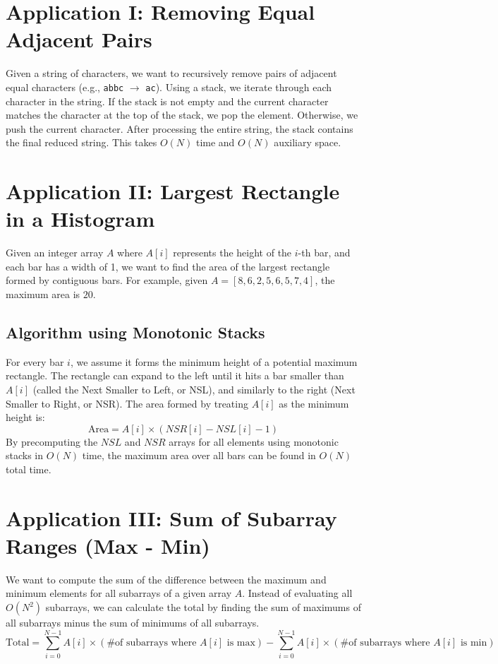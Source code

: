 \documentclass[10pt,journal,compsoc,onecolumn]{IEEEtran}
\begin{document}
\section{Application I: Removing Equal Adjacent Pairs}
Given a string of characters, we want to recursively remove pairs of adjacent equal characters (e.g., \texttt{abbc} $\to$ \texttt{ac}). Using a stack, we iterate through each character in the string. If the stack is not empty and the current character matches the character at the top of the stack, we pop the element. Otherwise, we push the current character. After processing the entire string, the stack contains the final reduced string. This takes $O(N)$ time and $O(N)$ auxiliary space.

\section{Application II: Largest Rectangle in a Histogram}
Given an integer array $A$ where $A[i]$ represents the height of the $i$-th bar, and each bar has a width of 1, we want to find the area of the largest rectangle formed by contiguous bars.
For example, given $A = [8, 6, 2, 5, 6, 5, 7, 4]$, the maximum area is $20$.

\subsection{Algorithm using Monotonic Stacks}
For every bar $i$, we assume it forms the minimum height of a potential maximum rectangle. The rectangle can expand to the left until it hits a bar smaller than $A[i]$ (called the Next Smaller to Left, or NSL), and similarly to the right (Next Smaller to Right, or NSR).
The area formed by treating $A[i]$ as the minimum height is:
\begin{equation}
\text{Area} = A[i] \times (NSR[i] - NSL[i] - 1)
\end{equation}
By precomputing the $NSL$ and $NSR$ arrays for all elements using monotonic stacks in $O(N)$ time, the maximum area over all bars can be found in $O(N)$ total time.

\section{Application III: Sum of Subarray Ranges (Max - Min)}
We want to compute the sum of the difference between the maximum and minimum elements for all subarrays of a given array $A$.
Instead of evaluating all $O(N^2)$ subarrays, we can calculate the total by finding the sum of maximums of all subarrays minus the sum of minimums of all subarrays.
\begin{equation}
\text{Total} = \sum_{i=0}^{N-1} A[i] \times (\text{\# of subarrays where } A[i] \text{ is max}) - \sum_{i=0}^{N-1} A[i] \times (\text{\# of subarrays where } A[i] \text{ is min})
\end{equation}
\end{document}
